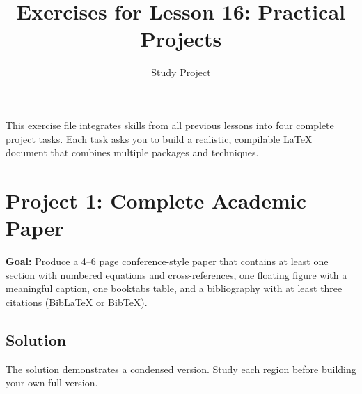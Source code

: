\documentclass[12pt, a4paper]{article}
\title{Exercises for Lesson 16: Practical Projects}
\author{Study Project}
\date{}
\begin{document}
\maketitle

\tableofcontents
\bigskip

\noindent
This exercise file integrates skills from all previous lessons into four
complete project tasks.  Each task asks you to build a realistic, compilable
\LaTeX{} document that combines multiple packages and techniques.


\section*{Project 1: Complete Academic Paper}

\textbf{Goal:} Produce a 4--6 page conference-style paper that contains at
least one section with numbered equations and cross-references, one
floating figure with a meaningful caption, one booktabs table, and a
bibliography with at least three citations (BibLaTeX or BibTeX).

\subsection*{Solution}

The solution demonstrates a condensed version.  Study each region before
building your own full version.
\end{document}
